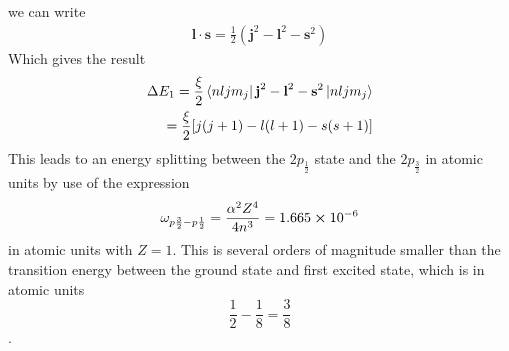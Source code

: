     we can write
    \begin{align}
        \textbf{l}\cdot\textbf{s}=\frac{1}{2}(\textbf{j}^2-\textbf{l}^2-\textbf{s}^2)
    \end{align}
	 Which gives the result
	 \begin{align*}
	     \Delta E_1=\frac{\xi}{2}\bra{nljm_j}
	         \textbf{j}^2-\textbf{l}^2-\textbf{s}^2
	         \ket{nljm_j}\\
	         =\frac{\xi}{2}[j(j+1)-l(l+1)-s(s+1)]
	 \end{align*}
	 This leads to an energy splitting between the \(2p_{\frac{1}{2}}\) state and the \(2p_{\frac{3}{2}}\) in atomic units by use of the expression
	 \begin{equation}
    \omega_{p\frac{3}{2}-p\frac{1}{2}}=\frac{\alpha^2Z^4}{4n^3}=1.665\cross10^{-6}
\end{equation}
in atomic units with $Z=1$. This is several orders of magnitude smaller than the transition energy between the ground state and first excited state, which is in atomic units 
\begin{equation}
    \frac{1}{2}-\frac{1}{8}=\frac{3}{8}
\end{equation}.
